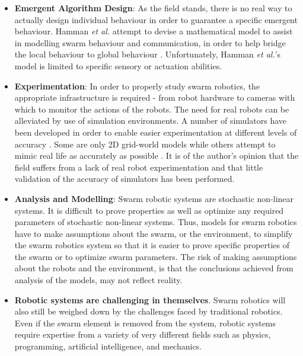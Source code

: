 \begin{itemize}

\item \textbf{Emergent Algorithm Design}: As the field stands, there is no real way to actually design individual behaviour in order to guarantee a specific emergent behaviour. Hamman \textit{et al.} attempt to devise a mathematical model to assist in modelling swarm behaviour and communication, in order to help bridge the local behaviour to global behaviour \cite{hamann2008framework}. Unfortunately, Hamman \textit{et al.}'s model is limited to specific sensory or actuation abilities. 

\item \textbf{Experimentation}: In order to properly study swarm robotics, the appropriate infrastructure is required - from robot hardware to cameras with which to monitor the actions of the robots. The need for real robots can be alleviated by use of simulation environments. A number of simulators have been developed in order to enable easier experimentation at different levels of accuracy \cite{vaughan2008massively,pinciroli2011argos, luke2005mason}. Some are only 2D grid-world models while others attempt to mimic real life as accurately as possible \cite{michel1998webots}. It is of the author's opinion that the field suffers from a lack of real robot experimentation and that little validation of the accuracy of simulators has been performed. 

\item \textbf{Analysis and Modelling}: Swarm robotic systems are stochastic non-linear systems. It is difficult to prove properties as well as optimize any required parameters of stochastic non-linear systems. Thus, models for swarm robotics have to make assumptions about the swarm, or the environment, to simplify the swarm robotics system so that it is easier to prove specific properties of the swarm or to optimize swarm parameters. The risk of making assumptions about the robots and the environment, is that the conclusions achieved from analysis of the models, may not reflect reality.

\item \textbf{Robotic systems are challenging in themselves}. Swarm robotics will also still be weighed down by the challenges faced by traditional robotics. Even if the swarm element is removed from the system, robotic systems require expertise from a variety of very different fields such as physics, programming, artificial intelligence, and mechanics.
\end{itemize}

